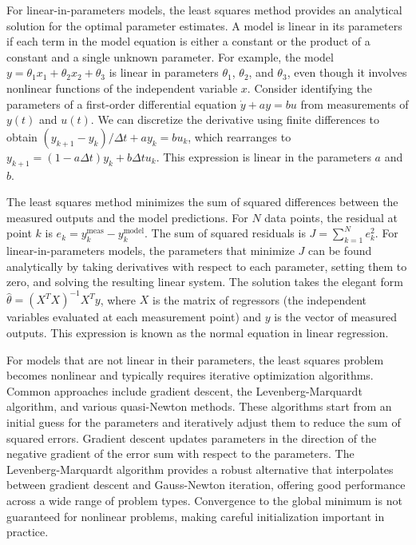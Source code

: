 For linear-in-parameters models, the least squares method provides an analytical solution for the optimal parameter estimates. A model is linear in its parameters if each term in the model equation is either a constant or the product of a constant and a single unknown parameter. For example, the model $y = \theta_1 x_1 + \theta_2 x_2 + \theta_3$ is linear in parameters $\theta_1$, $\theta_2$, and $\theta_3$, even though it involves nonlinear functions of the independent variable $x$. Consider identifying the parameters of a first-order differential equation $\dot{y} + a y = b u$ from measurements of $y(t)$ and $u(t)$. We can discretize the derivative using finite differences to obtain $(y_{k+1} - y_k)/\Delta t + a y_k = b u_k$, which rearranges to $y_{k+1} = (1 - a\Delta t)y_k + b\Delta t u_k$. This expression is linear in the parameters $a$ and $b$.

The least squares method minimizes the sum of squared differences between the measured outputs and the model predictions. For $N$ data points, the residual at point $k$ is $e_k = y_k^{\text{meas}} - y_k^{\text{model}}$. The sum of squared residuals is $J = \sum_{k=1}^N e_k^2$. For linear-in-parameters models, the parameters that minimize $J$ can be found analytically by taking derivatives with respect to each parameter, setting them to zero, and solving the resulting linear system. The solution takes the elegant form $\hat{\theta} = (X^TX)^{-1}X^Ty$, where $X$ is the matrix of regressors (the independent variables evaluated at each measurement point) and $y$ is the vector of measured outputs. This expression is known as the normal equation in linear regression.

For models that are not linear in their parameters, the least squares problem becomes nonlinear and typically requires iterative optimization algorithms. Common approaches include gradient descent, the Levenberg-Marquardt algorithm, and various quasi-Newton methods. These algorithms start from an initial guess for the parameters and iteratively adjust them to reduce the sum of squared errors. Gradient descent updates parameters in the direction of the negative gradient of the error sum with respect to the parameters. The Levenberg-Marquardt algorithm provides a robust alternative that interpolates between gradient descent and Gauss-Newton iteration, offering good performance across a wide range of problem types. Convergence to the global minimum is not guaranteed for nonlinear problems, making careful initialization important in practice.


